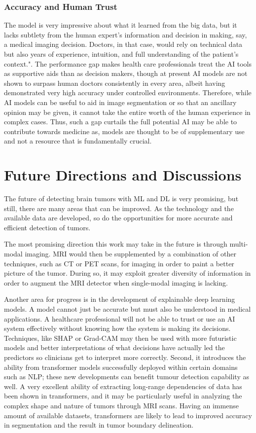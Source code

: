 \documentclass[conference]{IEEEtran}
\begin{document}
\subsubsection{Accuracy and Human Trust} The model is very impressive about what it learned from the big data, but it lacks subtlety from the human expert's information and decision in making, say, a medical imaging decision. Doctors, in that case, would rely on technical data but also years of experience, intuition, and full understanding of the patient's context.". The performance gap makes health care professionals treat the AI tools as supportive aids than as decision makers, though at present AI models are not shown to surpass human doctors consistently in every area, albeit having demonstrated very high accuracy under controlled environments. Therefore, while AI models can be useful to aid in image segmentation or so that an ancillary opinion may be given, it cannot take the entire worth of the human experience in complex cases. Thus, such a gap curtails the full potential AI may be able to contribute towards medicine as, models are thought to be of supplementary use and not a resource that is fundamentally crucial.


\section{Future Directions and Discussions}
The future of detecting brain tumors with ML and DL is very promising, but still, there are many areas that can be improved. As the technology and the available data are developed, so do the opportunities for more accurate and efficient detection of tumors.

The most promising direction this work may take in the future is through multi-modal imaging. MRI would then be supplemented by a combination of other techniques, such as CT or PET scans, for imaging in order to paint a better picture of the tumor. During so, it may exploit greater diversity of information in order to augment the MRI detector when single-modal imaging is lacking.

Another area for progress is in the development of explainable deep learning models. A model cannot just be accurate but must also be understood in medical applications. A healthcare professional will not be able to trust or use an AI system effectively without knowing how the system is making its decisions. Techniques, like SHAP or Grad-CAM may then be used with more futuristic models and better interpretations of what decisions have actually led the predictors so clinicians get to interpret more correctly. Second, it introduces the ability from transformer models successfully deployed within certain domains such as NLP; these new developments can benefit tumour detection capability as well. A very excellent ability of extracting long-range dependencies of data has been shown in transformers, and it may be particularly useful in analyzing the complex shape and nature of tumors through MRI scans. Having an immense amount of available datasets, transformers are likely to lead to improved accuracy in segmentation and the result in tumor boundary delineation.
\end{document}
